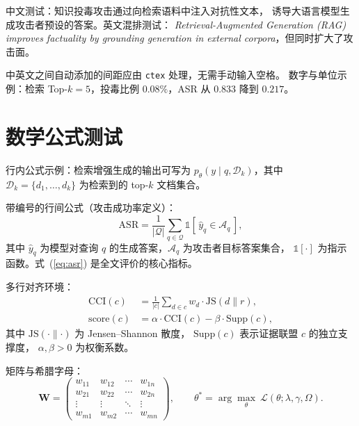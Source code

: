 \documentclass[UTF8, a4paper, 11pt, fontset=fandol]{ctexart}
\begin{document}
中文测试：知识投毒攻击通过向检索语料中注入对抗性文本，
诱导大语言模型生成攻击者预设的答案。英文混排测试：
\textit{Retrieval-Augmented Generation (RAG) improves factuality by grounding
generation in external corpora}，但同时扩大了攻击面。

中英文之间自动添加的间距应由 \texttt{ctex} 处理，无需手动输入空格。
数字与单位示例：检索 Top-$k = 5$，投毒比例 $0.08\%$，ASR 从 $0.833$ 降到 $0.217$。

\section{数学公式测试}

行内公式示例：检索增强生成的输出可写为
$p_\theta(y \mid q, \mathcal{D}_k)$，其中 $\mathcal{D}_k = \{d_1, \dots, d_k\}$
为检索到的 top-$k$ 文档集合。

带编号的行间公式（攻击成功率定义）：
\begin{equation}
  \mathrm{ASR} = \frac{1}{|\mathcal{Q}|} \sum_{q \in \mathcal{Q}}
  \mathbb{1}\!\left[\, \hat{y}_q \in \mathcal{A}_q \,\right],
  \label{eq:asr}
\end{equation}
其中 $\hat{y}_q$ 为模型对查询 $q$ 的生成答案，$\mathcal{A}_q$ 为攻击者目标答案集合，
$\mathbb{1}[\cdot]$ 为指示函数。式~(\ref{eq:asr}) 是全文评价的核心指标。

多行对齐环境：
\begin{align}
  \mathrm{CCI}(c) &= \frac{1}{|c|}\sum_{d \in c} w_d \cdot \mathrm{JS}(d \parallel r),
  \label{eq:cci1} \\[4pt]
  \mathrm{score}(c) &= \alpha \cdot \mathrm{CCI}(c) - \beta \cdot \mathrm{Supp}(c),
  \label{eq:cci2}
\end{align}
其中 $\mathrm{JS}(\cdot \parallel \cdot)$ 为 Jensen--Shannon 散度，
$\mathrm{Supp}(c)$ 表示证据联盟 $c$ 的独立支撑度，
$\alpha, \beta > 0$ 为权衡系数。

矩阵与希腊字母：
\[
  \bm{W} =
  \begin{pmatrix}
    w_{11} & w_{12} & \cdots & w_{1n} \\
    w_{21} & w_{22} & \cdots & w_{2n} \\
    \vdots & \vdots & \ddots & \vdots \\
    w_{m1} & w_{m2} & \cdots & w_{mn}
  \end{pmatrix},
  \qquad
  \theta^{*} = \arg\max_{\theta}\ \mathcal{L}(\theta; \lambda, \gamma, \Omega).
\]

\end{document}
